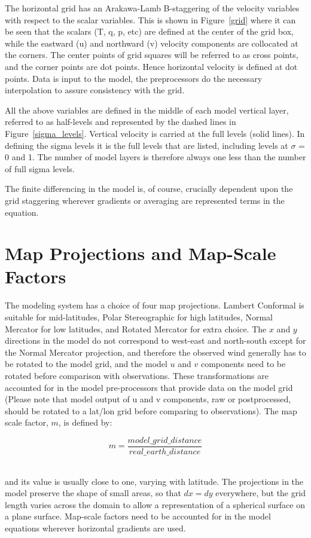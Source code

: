 The horizontal grid has an Arakawa-Lamb B-staggering of the velocity variables
with respect to the scalar variables. This is shown in Figure~\ref{grid} where
it can be seen that the scalars (T, q, p, etc) are defined at the center of the
grid box, while the eastward (u) and northward (v) velocity components are
collocated at the corners. The center points of grid squares will be referred to
as cross points, and the corner points are dot points.  Hence horizontal
velocity is defined at dot points. Data is input to the model, the preprocessors
do the necessary interpolation to assure consistency with the grid.

All the above variables are defined in the middle of each model vertical layer,
referred to as half-levels and represented by the dashed lines in
Figure~\ref{sigma_levels}. Vertical velocity is carried at the full levels
(solid lines). In defining the sigma levels it is the full levels that are
listed, including levels at $\sigma$ = 0 and 1. The number of model layers is
therefore always one less than the number of full sigma levels.

The finite differencing in the model is, of course, crucially dependent upon the
grid staggering wherever gradients or averaging are represented terms in the
equation.

\section{Map Projections and Map-Scale Factors}
The modeling system has a
choice of four map projections. Lambert Conformal is suitable for mid-latitudes,
Polar Stereographic for high latitudes, Normal Mercator for low latitudes, and
Rotated Mercator for extra choice. The $x$ and $y$ directions in the model do
not correspond to west-east and north-south except for the Normal Mercator
projection, and therefore the observed wind generally has to be rotated to the
model grid, and the model $u$ and $v$ components need to be rotated before
comparison with observations. These transformations are accounted for in the
model pre-processors that provide data on the model grid (Please note that
model output of u and v components, raw or postprocessed, should be rotated to a
lat/lon grid before comparing to observations).  The map scale factor, $m$, is
defined by:

\begin{equation}
  m = \frac{model\_grid\_distance}{real\_earth\_distance}
\end{equation}

\noindent \\ and its value is usually close to one, varying with latitude. The
projections in the model preserve the shape of small areas, so that $dx=dy$
everywhere, but the grid length varies across the domain to allow a
representation of a spherical surface on a plane surface. Map-scale factors need
to be accounted for in the model equations wherever horizontal gradients are
used.


